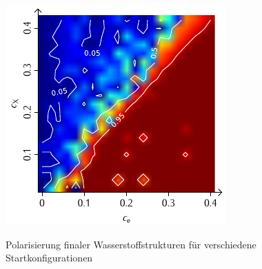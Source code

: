 \documentclass[a4paper, 10pt, twoside, openany]{book} %
\begin{document}
\begin{figure}
\begin{minipage}[t]{0.48\textwidth}
        \label{H_individual_P}
    \end{minipage}
    \hfill
    \begin{minipage}[t]{0.48\textwidth}
        \includegraphics[width=\textwidth]{Abbildungen/Phasendiagramme/Konturen/H_penalty_individual_P.pdf}
        \label{H_penalty_individual_P}
    \end{minipage}
    \caption[Polarisierung finaler Wasserstoffstrukturen]{Polarisierung finaler Wasserstoffstrukturen für verschiedene Startkonfigurationen}
    \label{H_P}
\end{figure}
\end{document}

